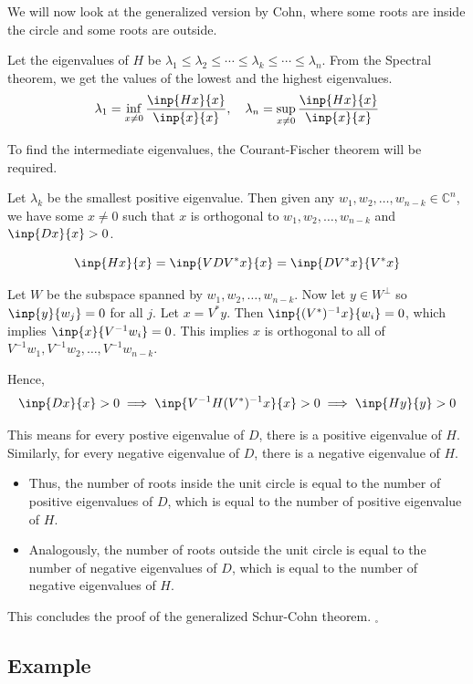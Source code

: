 \documentclass[twoside]{article}
\newcommand*\adj[1]{#1^*}
\theoremstyle{plain}
\theoremstyle{definition}
\theoremstyle{remark}
\begin{document}
We will now look at the generalized version by Cohn, where some roots are inside the circle and some roots are outside.




Let the eigenvalues of \(H\) be \(\lambda_1 \le \lambda_2 \le \cdots \le \lambda_k \le \cdots \le \lambda_n\).
From the Spectral theorem, we get the values of the lowest and the highest eigenvalues. 
\[\lambda_1 = \inf _{x \ne 0} \frac{\inp{Hx}{x}}{\inp{x}{x}}, \quad \lambda_n = \sup_{x \ne 0} \frac{\inp{Hx}{x}}{\inp{x}{x}}\]

To find the intermediate eigenvalues, the Courant-Fischer theorem will be required. 


Let \(\lambda_k\) be the smallest positive eigenvalue. Then given any \(w_1, w_2, \ldots , w_{n-k} \in \mathbb{C}^n\), we have some \(x \ne 0\) such that \(x\) is orthogonal to \( w_1, w_2 , \ldots , w_{n-k}\) and \(\inp{Dx}{x} > 0\).

\[\inp{Hx}{x} = \inp{VD\adj{V} x}{x} = \inp{D\adj{V} x}{\adj{V}x}\]

 Let \(W\) be the subspace spanned by \(w_1, w_2, \ldots , w_{n-k}\). Now let \(y \in W^\perp\) so \(\inp{y}{w_j} = 0\) for all \(j\). Let \(x = \adj{V}y\).  Then \( \inp{(\adj{V})^{-1}x}{w_i} = 0\), which implies  \( \inp{x}{V^{-1} w_i} = 0\). This implies \(x\) is orthogonal to all of \(V^{-1}w_1,  V^{-1} w_2, \ldots , V^{-1} w_{n-k}\).

Hence,
\[\inp{Dx}{x} > 0 \implies \inp{V^{-1} H (\adj{V})^{-1} x}{x} > 0 \implies \inp{Hy}{y} > 0\]

This means for every postive eigenvalue of \(D\), there is a positive eigenvalue of \(H\). Similarly, for every negative eigenvalue of \(D\), there is a negative eigenvalue of \(H\). 

\begin{itemize}
\item Thus, the number of roots inside the unit circle is equal to the number of positive eigenvalues of \(D\), which is equal to the number of positive eigenvalue of \(H\).
 
\item Analogously, the number of roots outside the unit circle is equal to the number of negative eigenvalues of \(D\), which is equal to the number of negative eigenvalues of \(H\).
\end{itemize}
This concludes the proof of the generalized Schur-Cohn theorem. \(_\square\)
\subsection{Example}
\end{document}
